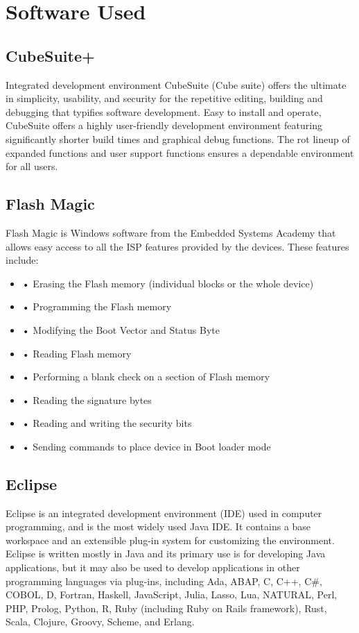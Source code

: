\documentclass[12pt,a4paper]{report}
\begin{document}
\section{Software Used}
\subsection{CubeSuite+}
Integrated development environment CubeSuite (Cube suite) offers the ultimate in simplicity, usability, and security for the repetitive editing, building and debugging that typifies software development. Easy to install and operate, CubeSuite offers a highly user-friendly development environment featuring significantly shorter build times and graphical debug functions. The rot lineup of expanded functions and user support functions ensures a dependable environment for all users.
\subsection{Flash Magic}
Flash Magic is Windows software from the Embedded Systems Academy that allows easy
access to all the ISP features provided by the devices. These features include:
\begin{itemize}
	\item 	• Erasing the Flash memory (individual blocks or the whole device)
	\item	• Programming the Flash memory
	\item	• Modifying the Boot Vector and Status Byte
	\item	• Reading Flash memory
	\item	• Performing a blank check on a section of Flash memory
	\item	• Reading the signature bytes
	\item	• Reading and writing the security bits
	
	\item	• Sending commands to place device in Boot loader mode
\end{itemize}
\subsection{Eclipse}
Eclipse is an integrated development environment (IDE) used in computer programming, and is the most widely used Java IDE. It contains a base workspace and an extensible plug-in system for customizing the environment. Eclipse is written mostly in Java and its primary use is for developing Java applications, but it may also be used to develop applications in other programming languages via plug-ins, including Ada, ABAP, C, C++, C\#, COBOL, D, Fortran, Haskell, JavaScript, Julia, Lasso, Lua, NATURAL, Perl, PHP, Prolog, Python, R, Ruby (including Ruby on Rails framework), Rust, Scala, Clojure, Groovy, Scheme, and Erlang.
\end{document}
